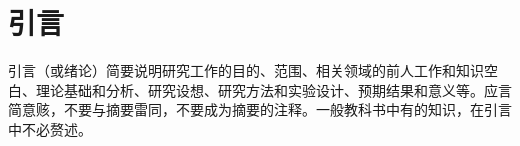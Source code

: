 \chapter{引言}
\label{cha:intro}

引言（或绪论）简要说明研究工作的目的、范围、相关领域的前人工作和知识空白、理论基础和分析、研究设想、研究方法和实验设计、预期结果和意义等。应言简意赅，不要与摘要雷同，不要成为摘要的注释。一般教科书中有的知识，在引言中不必赘述。




